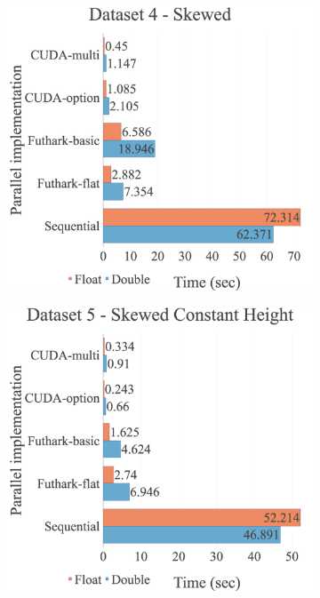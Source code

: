 \begin{figure}[H]
\begin{adjustwidth}{-2cm}{-2cm}
\begin{subfigure}{.62\textwidth}
  \centering
  \includegraphics[width=1\textwidth]{img/experiments/all-approaches-4_SKEWED.png}
\end{subfigure}
\begin{subfigure}{.62\textwidth}
  \centering
  \includegraphics[width=1\textwidth]{img/experiments/all-approaches-5_SKEWEDCONSTHEIGHT.png}

\end{subfigure}
\end{adjustwidth}
\end{figure}
